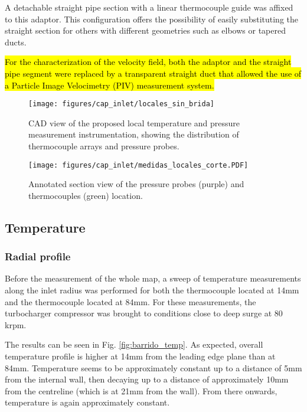 A detachable straight pipe section with a linear thermocouple guide was affixed to this adaptor. This configuration offers the possibility of easily substituting the straight section for others with different geometries such as elbows or tapered ducts.

\hl{For the characterization of the velocity field, both the adaptor and the straight pipe segment were replaced by a transparent straight duct that allowed the use of a Particle Image Velocimetry (PIV) measurement system.}

\begin{figure}[htb!]
\centering
\texttt{[image: figures/cap\_inlet/locales\_sin\_brida]}
\caption{CAD view of the proposed local temperature and pressure measurement instrumentation, showing the distribution of thermocouple arrays and pressure probes.}
\label{fig:metod_local_meas}
\end{figure}

\begin{figure}[b!]
\centering
\texttt{[image: figures/cap\_inlet/medidas\_locales\_corte.PDF]}
\caption{Annotated section view of the pressure probes (purple) and thermocouples (green) location.}
\label{fig:metod_local_meas_dimen}
\end{figure}

\subsection{Temperature}
\label{sub:temperature}

\subsubsection{Radial profile}
Before the measurement of the whole map, a sweep of temperature measurements along the inlet radius was performed for both the thermocouple located at 14mm and the thermocouple located at 84mm. For these measurements, the turbocharger compressor was brought to conditions close to deep surge at 80 krpm.

The results can be seen in Fig. \ref{fig:barrido_temp}. As expected, overall temperature profile is higher at 14mm from the leading edge plane than at 84mm. Temperature seems to be approximately constant up to a distance of 5mm from the internal wall, then decaying up to a distance of approximately 10mm from the centreline (which is at 21mm from the wall). From there onwards, temperature is again approximately constant.

